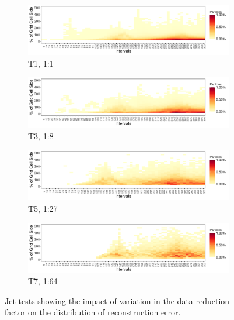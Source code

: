 \begin{figure}[!t]
\begin{subfigure}{\linewidth}
\centering
\includegraphics[width=\linewidth]{Images/Jet_Intervals_T1_Percent.pdf}
\caption{T1, 1:1}
\label{fig:jet_1}
\end{subfigure}
\begin{subfigure}{\linewidth}
\centering
\includegraphics[width=\linewidth]{Images/Jet_Intervals_T3_Percent.pdf}
\caption{T3, 1:8}
\label{fig:jet_3}
\end{subfigure}
\begin{subfigure}{\linewidth}
\centering
\includegraphics[width=\linewidth]{Images/Jet_Intervals_T5_Percent.pdf}
\caption{T5, 1:27}
\label{fig:jet_5}
\end{subfigure}
\begin{subfigure}{\linewidth}
\centering
\includegraphics[width=\linewidth]{Images/Jet_Intervals_T7_Percent.pdf}
\caption{T7, 1:64}
\label{fig:jet_7}
\end{subfigure}
\caption{Jet tests showing the impact of variation in the data reduction factor on the distribution of reconstruction error.}
\label{fig:jet_map}
\end{figure}
